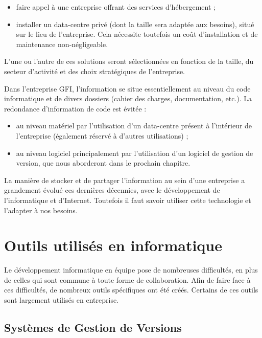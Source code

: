 \begin{itemize}
\item faire appel à une entreprise offrant des services d'hébergement ;
\item installer un data-centre privé (dont la taille sera adaptée aux besoins), situé sur le lieu de l'entreprise. Cela nécessite toutefois un coût d'installation et de maintenance non-négligeable.
\end{itemize}

L'une ou l'autre de ces solutions seront sélectionnées en fonction de la taille, du secteur d'activité et des choix stratégiques de l'entreprise.


\begin{app}
Dans l'entreprise GFI, l'information se situe essentiellement au niveau du code informatique et de divers dossiers (cahier des charges, documentation, etc.). La redondance d'information de code est évitée :
\begin{itemize}
\item au niveau matériel par l'utilisation d'un data-centre présent à l'intérieur de l'entreprise (également réservé à d'autres utilisations) ;
\item au niveau logiciel principalement par l'utilisation d'un logiciel de gestion de version, que nous aborderont dans le prochain chapitre.
\end{itemize}
\end{app}

La manière de stocker et de partager l'information au sein d'une entreprise a grandement évolué ces dernières décennies, avec le développement de l'informatique et d'Internet. Toutefois il faut savoir utiliser cette technologie et l'adapter à nos besoins.

\section{Outils utilisés en informatique}

Le développement informatique en équipe pose de nombreuses difficultés, en plus de celles qui sont commune à toute forme de collaboration. Afin de faire face à ces difficultés, de nombreux outils spécifiques ont été créés. Certains de ces outils sont largement utilisés en entreprise.

\subsection{Systèmes de Gestion de Versions}

